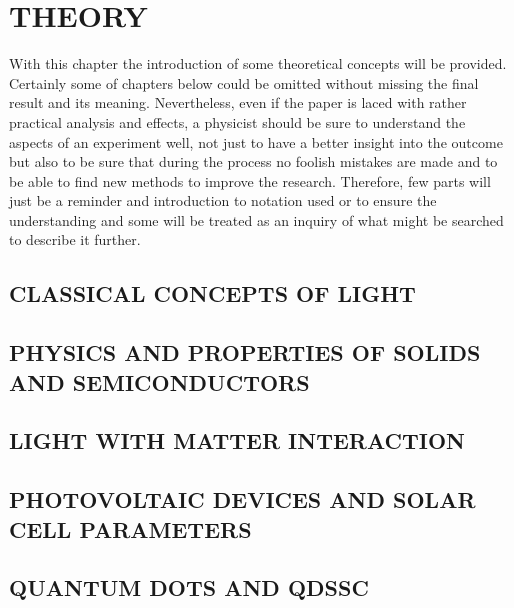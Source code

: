 \chapter{THEORY}

With this chapter the introduction of some theoretical concepts will be provided. Certainly some of chapters below could be omitted without missing the final result and its meaning. Nevertheless, even if the paper is laced with rather practical analysis and effects, a physicist should be sure to understand the aspects of an experiment well, not just to have a better insight into the outcome but also to be sure that during the process no foolish mistakes are made and to be able to find new methods to improve the research. Therefore, few parts will just be a reminder and introduction to notation used or to ensure the understanding and some will be treated as an inquiry of what might be searched to describe it further. 
\section{CLASSICAL CONCEPTS OF LIGHT}

\section{PHYSICS AND PROPERTIES OF SOLIDS AND SEMICONDUCTORS}

\section{LIGHT WITH MATTER INTERACTION}

\section{PHOTOVOLTAIC DEVICES AND SOLAR CELL PARAMETERS}

\section{QUANTUM DOTS AND QDSSC}
